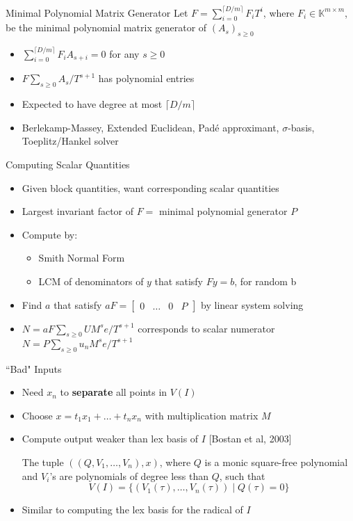 \documentclass{beamer}
\begin{document}
\begin{frame}{Minimal Polynomial Matrix Generator}
	Let $F = \sum_{i=0}^{\lceil{D/m}\rceil} F_i T^i$,
	where $F_i \in \mathbb{K}^{m\times m}$, be the 
	minimal polynomial matrix generator of $(A_s)_{s\ge 0}$
	\begin{itemize}
		\item $\sum_{i=0}^{\lceil{D/m}\rceil} F_i A_{s+i} =0$ for any $s\ge 0$
		\item $F \sum_{s\ge 0} A_s/T^{s+1}$ has polynomial entries
		\item Expected to have degree at most $\lceil D/m \rceil$
		\item Berlekamp-Massey, Extended Euclidean, Pad\'e
		approximant, $\sigma$-basis, Toeplitz/Hankel solver
	\end{itemize}
\end{frame}

\begin{frame}{Computing Scalar Quantities}
	\begin{itemize}
		\item Given block quantities, want corresponding scalar quantities
		\item Largest invariant factor of $F =$
		minimal polynomial generator $P$
		\item Compute by:
		\begin{itemize}
			\item Smith Normal Form
			\item LCM of denominators of $y$ that satisfy $Fy = b$, for random b
		\end{itemize}
		\item Find $a$ that satisfy $aF = \begin{bmatrix}
		0 & \dots & 0 & P
		\end{bmatrix}$ by linear system solving
		\item $N = aF \sum_{s\ge 0} U M^s e/ T^{s+1}$ corresponds to scalar
		numerator $N = P\sum_{s\ge 0} u_n M^s e/ T^{s+1}$
	\end{itemize}
\end{frame}

\begin{frame}{``Bad" Inputs}
	\begin{itemize}
		\item Need $x_n$ to \textbf{separate} all points in $V(I)$
		\item Choose $x = t_1 x_1 + \dots + t_n x_n$ with multiplication matrix $M$
		\item Compute output weaker than lex basis of $I$ [Bostan et al, 2003]
		\begin{definition}
			The tuple $((Q,V_1,\dots,V_n),x)$, where $Q$ is a monic square-free
			polynomial and $V_i$'s are polynomials of degree less than $Q$, such
			that
			$$ V(I) = \{ (V_1(\tau), \dots, V_n(\tau)) \mid Q(\tau) = 0 \} $$
		\end{definition}
		\item Similar to computing the lex basis for the radical of $I$
	\end{itemize}

\end{frame}
\end{document}

